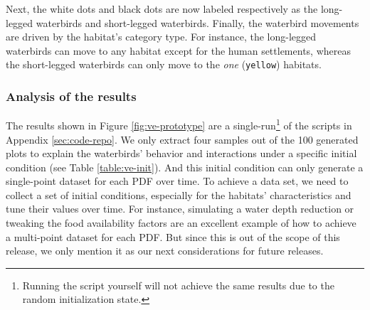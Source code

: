 
Next, the white dots and black dots are now labeled respectively as the long-legged waterbirds and short-legged waterbirds. Finally, the waterbird movements are driven by the habitat's category type. For instance, the long-legged waterbirds can move to any habitat except for the human settlements, whereas the short-legged waterbirds can only move to the \emph{one} (\texttt{yellow}) habitats.

\subsubsection{Analysis of the results}
The results shown in Figure \ref{fig:ve-prototype} are a single-run\footnote{Running the script yourself will not achieve the same results due to the random initialization state.} of the scripts in Appendix \ref{sec:code-repo}. We only extract four samples out of the 100 generated plots to explain the waterbirds' behavior and interactions under a specific initial condition (see Table \ref{table:ve-init}). And this initial condition can only generate a single-point dataset for each PDF over time. To achieve a data set, we need to collect a set of initial conditions, especially for the habitats' characteristics and tune their values over time. For instance, simulating a water depth reduction or tweaking the food availability factors are an excellent example of how to achieve a multi-point dataset for each PDF. But since this is out of the scope of this release, we only mention it as our next considerations for future releases.

